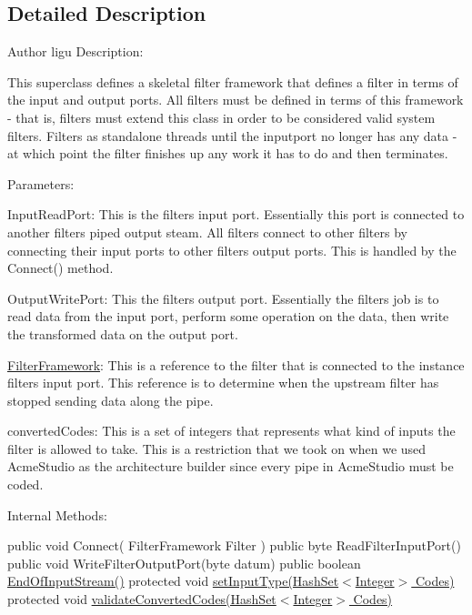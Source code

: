 \subsection{Detailed Description}
\begin{DoxyAuthor}{Author}
ligu Description\+:
\end{DoxyAuthor}
This superclass defines a skeletal filter framework that defines a filter in terms of the input and output ports. All filters must be defined in terms of this framework -\/ that is, filters must extend this class in order to be considered valid system filters. Filters as standalone threads until the inputport no longer has any data -\/ at which point the filter finishes up any work it has to do and then terminates.

Parameters\+:

Input\+Read\+Port\+: This is the filter\textquotesingle{}s input port. Essentially this port is connected to another filter\textquotesingle{}s piped output steam. All filters connect to other filters by connecting their input ports to other filter\textquotesingle{}s output ports. This is handled by the Connect() method.

Output\+Write\+Port\+: This the filter\textquotesingle{}s output port. Essentially the filter\textquotesingle{}s job is to read data from the input port, perform some operation on the data, then write the transformed data on the output port.

\hyperlink{class_system_a_1_1_filter_framework}{Filter\+Framework}\+: This is a reference to the filter that is connected to the instance filter\textquotesingle{}s input port. This reference is to determine when the upstream filter has stopped sending data along the pipe.

converted\+Codes\+: This is a set of integers that represents what kind of inputs the filter is allowed to take. This is a restriction that we took on when we used Acme\+Studio as the architecture builder since every pipe in Acme\+Studio must be coded.

Internal Methods\+:

public void Connect( Filter\+Framework Filter ) public byte Read\+Filter\+Input\+Port() public void Write\+Filter\+Output\+Port(byte datum) public boolean \hyperlink{class_system_a_1_1_filter_framework_ac54511ad34d190b58ea3baecd6a70692}{End\+Of\+Input\+Stream()} protected void \hyperlink{class_system_a_1_1_filter_framework_a856b3a8b6b49ad1124de579485e86122}{set\+Input\+Type(\+Hash\+Set$<$\+Integer$>$ Codes)} protected void \hyperlink{class_system_a_1_1_filter_framework_a20e7a6999d87d75474742dafd6edb482}{validate\+Converted\+Codes(\+Hash\+Set$<$\+Integer$>$ Codes)} 

